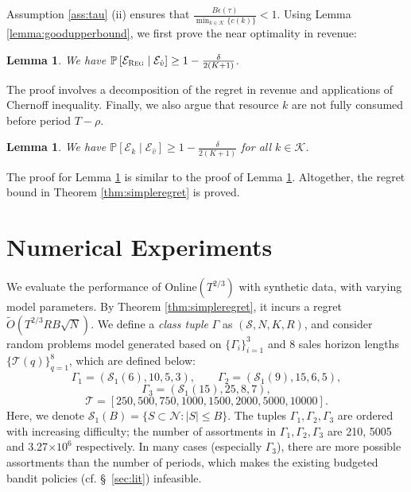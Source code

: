 \documentclass{article}
\newtheorem{lemma}[theorem]{Lemma}
\theoremstyle{definition}
\newcommand{\PPP}{\mathbb{P}}
\newcommand{\KKK}{\mathcal{K}}
\newcommand{\NNN}{\mathcal{N}}
\newcommand{\SSS}{\mathcal{S}}
\newcommand{\TTT}{\mathcal{T}}
\begin{document}
Assumption \ref{ass:tau} (ii) ensures that $\frac{B\epsilon(\tau)}{\min_{k\in\KKK}\{c(k)\}} < 1$. %
Using Lemma \ref{lemma:goodupperbound}, we first prove the near optimality in revenue: %
\begin{lemma}\label{lemma:goodrevenue}
We have $\PPP\left[\mathcal{E}_{\text{{\sc Reg}}}\mid \mathcal{E}_{\hat{v}}\right] \geq 1 - \frac{\delta}{2(K+1)}$.
\end{lemma}
The proof involves a decomposition of the regret  in revenue and applications of Chernoff inequality. Finally, we also argue that resource $k$ are not fully consumed before period $T - \rho$.
\begin{lemma}\label{lemma:enoughresource}
We have $\PPP\left[\mathcal{E}_k\mid \mathcal{E}_{\hat{v}}\right]\geq 1 - \frac{\delta}{2(K+1)}$ for all $k\in \KKK$.
\end{lemma}
The proof for Lemma \ref{lemma:enoughresource} is similar to the proof of Lemma \ref{lemma:goodrevenue}. Altogether, the regret bound in Theorem \ref{thm:simpleregret} is proved. 

\section{Numerical Experiments}\label{sec:numerical} 
We evaluate the performance of {\sc Online}$(T^{2/3})$ with synthetic data, with varying model parameters. By Theorem \ref{thm:simpleregret}, it incurs a regret $\tilde{O}(T^{2/3}RB\sqrt{N})$. We define a \emph{class tuple} $\Gamma$ as $(\SSS, N, K, R)$, and consider random problems  model generated based on $\{\Gamma_i\}^3_{i=1}$ and 8 sales horizon lengths $\{\TTT(q)\}^8_{q=1}$, which are defined below:
\begin{equation*}
\Gamma_1 = (\SSS_1(6), 10, 5, 3), \qquad \Gamma_2 = (\SSS_1(9),15, 6, 5),  
\end{equation*}
\begin{equation*}
\Gamma_3 = (\SSS_1(15), 25, 8, 7),
\end{equation*}
\begin{equation*}
\TTT = [250, 500, 750, 1000, 1500, 2000, 5000, 10000].
\end{equation*}
Here, we denote $\SSS_1(B) = \{S\subset \NNN: |S|\leq B\}$. The tuples $\Gamma_1, \Gamma_2, \Gamma_3$ are ordered with increasing difficulty; the number of assortments in $\Gamma_1, \Gamma_2, \Gamma_3$ are 210, 5005 and 3.27$\times 10^6$ respectively. In many cases (especially $\Gamma_3$), there are more possible assortments than the number of periods, which makes the existing budgeted bandit policies (cf. \S~\ref{sec:lit}) infeasible. 
\end{document}
